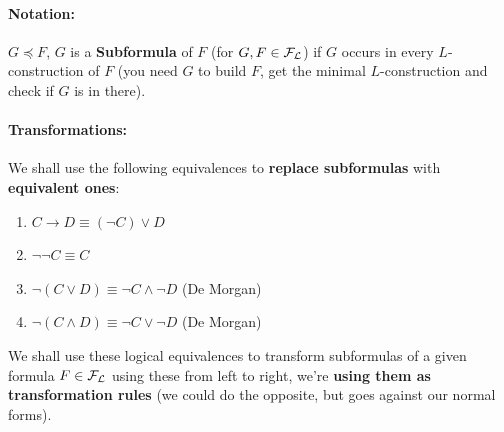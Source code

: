 
	\paragraph{Notation:} $G \preceq F$, $G$ is a \textbf{Subformula} of $F$ (for $G,F \in \mathcal{F}_\mathcal{L}$) if $G$ occurs in every $L$-construction of $F$ (you need $G$ to build $F$, get the minimal $L$-construction and check if $G$ is in there).\\

	\paragraph{Transformations:} We shall use the following equivalences to \textbf{replace subformulas} with \textbf{equivalent ones}:
	\begin{enumerate}
		\item $C \rightarrow D \equiv (\neg C) \vee D$
		\item $\neg \neg C \equiv C$
		\item $\neg (C \vee D) \equiv \neg C \wedge \neg D$ (De Morgan)
		\item $\neg (C \wedge D) \equiv \neg C \vee \neg D$ (De Morgan)
	\end{enumerate}

	We shall use these logical equivalences to transform subformulas of a given formula $F \in \mathcal{F}_\mathcal{L}$ using these from left to right, we're \textbf{using them as transformation rules} (we could do the opposite, but goes against our normal forms).


